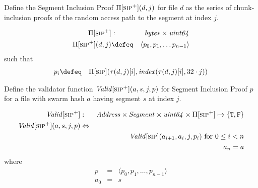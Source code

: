 \begin{definition}
\label{def:sip+}
Define the Segment Inclusion Proof $\Pi[\textsc{\lowercase{SIP}}^{+}](d, j)$ for file $d$ as the series of chunk-inclusion proofs of the random access path to the segment at index  $j$.

\begin{eqnarray}
\Pi[\textsc{\lowercase{SIP}}^{+}]&:&\mathit{byte}{*}\times\mathit{uint64}\\
\Pi[\textsc{\lowercase{SIP}}^{+}](d, j)&\defeq&\langle p_0, p_1, \ldots p_{n-1}\rangle
\end{eqnarray}
such that
\begin{eqnarray}
p_i&\defeq&
\Pi[\textsc{\lowercase{SIP}}](\tau(d,j)[i], \mathit{index}(\tau(d,j)[i],32\cdot j))
\end{eqnarray}
\end{definition}

\begin{definition}
\label{def:sip+-validity}
Define the validator function $\mathit{Valid}[\textsc{\lowercase{SIP}}^{+}](a,s,j,p)$ for Segment Inclusion Proof $p$ for a file with swarm hash $a$ having segment $s$ at index  $j$.

\begin{eqnarray}
\mathit{Valid}[\textsc{\lowercase{SIP}}^{+}]&:&\mathit{Address}\times\mathit{Segment}\times\mathit{uint64}\times\Pi[\textsc{\lowercase{SIP}}^{+}]\mapsto\{\mathtt{T,F}\}\\
\mathit{Valid}[\textsc{\lowercase{SIP}}^{+}](a,s,j,p)&\Leftrightarrow&\\
&&\mathit{Valid}[\textsc{\lowercase{SIP}}](a_{i+1}, a_i,j,p_i)
\text{ for }0\leq i<n\\
&&a_n=a
\end{eqnarray}
where
\begin{eqnarray}
p&=&\langle p_0, p_1, \ldots, p_{n-1}\rangle\\
a_0&=&s
\end{eqnarray}
\end{definition}

